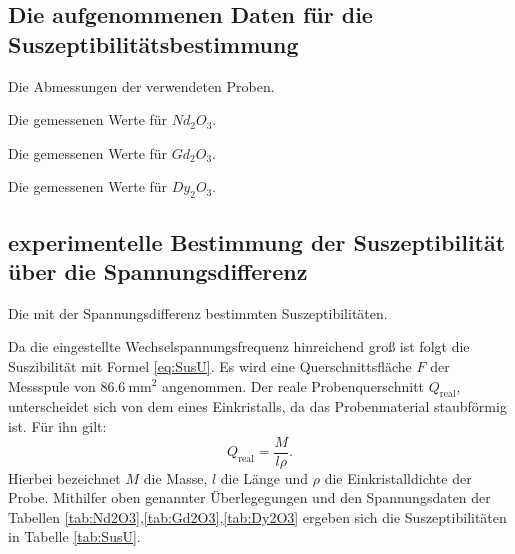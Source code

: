 \subsection{Die aufgenommenen Daten für die Suszeptibilitätsbestimmung}

\begin{table}
 \centering
 \caption{Die Abmessungen der verwendeten Proben.}
 
 \label{tab:basis}
\end{table}




\begin{table}
 \centering
 \caption{Die gemessenen Werte für $Nd_2O_3$.}
 
 \label{tab:Nd2O3}
\end{table}

\begin{table}
 \centering
 \caption{Die gemessenen Werte für $Gd_2O_3$.}
 
 \label{tab:Gd2O3}
\end{table}


\begin{table}
 \centering
 \caption{Die gemessenen Werte für $Dy_2O_3$.}
 
 \label{tab:Dy2O3}
\end{table}

\subsection{experimentelle Bestimmung der Suszeptibilität über die Spannungsdifferenz}

\begin{table}
 \centering
 \caption{Die mit der Spannungsdifferenz bestimmten Suszeptibilitäten.}
 
 \label{tab:SusU}
\end{table}

Da die eingestellte Wechselspannungsfrequenz hinreichend groß ist folgt die
Suszibilität mit Formel \ref{eq:SusU}. Es wird eine Querschnittsfläche $F$
der Messspule von $\SI{86.6}{\milli\meter\squared}$ angenommen. Der reale Probenquerschnitt $Q_\text{real}$,
unterscheidet sich von dem eines Einkristalls, da das Probenmaterial staubförmig ist. Für ihn gilt:
\begin{equation}
  Q_\text{real} = \frac{M}{l \rho}\text{.}
\end{equation}
Hierbei bezeichnet $M$ die Masse, $l$ die Länge und $\rho$ die Einkristalldichte der Probe.
Mithilfer oben genannter Überlegegungen und den Spannungsdaten der Tabellen \ref{tab:Nd2O3},\ref{tab:Gd2O3},\ref{tab:Dy2O3}
ergeben sich die Suszeptibilitäten in Tabelle \ref{tab:SusU}.



